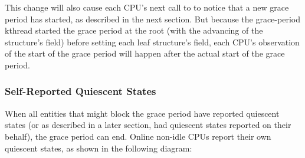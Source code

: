 \begin{center}
\end{center}

This change will also cause each CPU's next call to
 to notice that a new grace period has started,
as described in the next section.
But because the grace-period kthread
started the grace period at the root (with the advancing of the
 structure's  field) before setting each leaf
 structure's  field, each CPU's observation of
the start of the grace period will happen after the actual start of the
grace period.

\QuickQuizEnd

\subsubsection{Self-Reported Quiescent States}
\label{sec:rcu:memorder:Self-Reported Quiescent States}

When all entities that might block the grace period have reported
quiescent states (or as described in a later section, had quiescent
states reported on their behalf), the grace period can end. Online
non-idle CPUs report their own quiescent states, as shown in the
following diagram:

